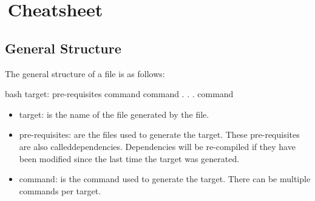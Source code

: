 \section{\,Cheatsheet}

\subsection{General Structure}

The general structure of a  file is as follows:
\begin{mintedbox}{bash}
target: pre-requisites
    command
    command
    .
    .
    .
    command
\end{mintedbox}
\begin{itemize}
    \item target: is the name of the file generated by the  file.
    \item pre-requisites: are the files used to generate the target. These
    pre-requisites are also called\linebreak dependencies. Dependencies will be
    re-compiled if they have been modified since the last time the target was
    generated.
    \item command: is the command used to generate the target. There can be
    multiple commands per target.
\end{itemize}

